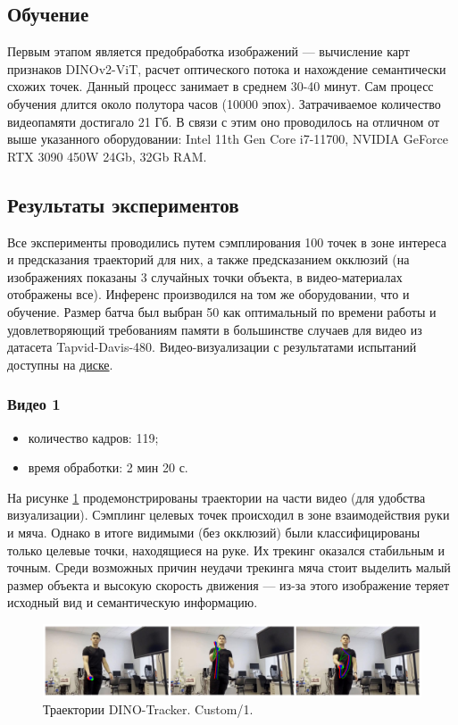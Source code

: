 \documentclass[a4paper, 14pt]{extarticle}
\theoremstyle{definition}
\theoremstyle{plain}
\theoremstyle{remark}
\begin{document}
\subsection{Обучение}

Первым этапом является предобработка изображений --- вычисление карт признаков DINOv2-ViT, расчет оптического потока и нахождение семантически схожих точек. Данный процесс занимает в среднем 30-40 минут. Сам процесс обучения длится около полутора часов (10000 эпох).
Затрачиваемое количество видеопамяти достигало 21 Гб. В связи с этим оно проводилось на отличном от выше указанного оборудовании: Intel 11th Gen Core i7-11700, NVIDIA GeForce RTX 3090 450W 24Gb, 32Gb RAM.

\subsection{Результаты экспериментов}
Все эксперименты проводились путем сэмплирования 100 точек в зоне интереса и предсказания траекторий для них, а также предсказанием окклюзий (на изображениях показаны 3 случайных точки объекта, в видео-материалах отображены все). Инференс производился на том же оборудовании, что и обучение. Размер батча был выбран 50 как оптимальный по времени работы и удовлетворяющий требованиям памяти в большинстве случаев для видео из датасета Tapvid-Davis-480. Видео-визуализации с результатами испытаний доступны на \href{https://drive.google.com/drive/folders/1jyuXTmpgYpkRt16hLX30Lu-oDO__paxN?usp=drive_link}{диске}.

\subsubsection{Видео 1}
\begin{itemize}
	\item количество кадров: 119;
	\item время обработки: 2 мин 20 с.
\end{itemize}

На рисунке \ref{fig:custom-1} продемонстрированы траектории на части видео (для удобства визуализации). Сэмплинг целевых точек происходил в зоне взаимодействия руки и мяча. Однако в итоге видимыми (без окклюзий) были классифицированы только целевые точки, находящиеся на руке. Их трекинг оказался стабильным и точным. Среди возможных причин неудачи трекинга мяча стоит выделить малый размер объекта и высокую скорость движения --- из-за этого изображение теряет исходный вид и семантическую информацию. 
\begin{figure}
    [H]
    \centering
    \includegraphics[width=\textwidth]{figs/custom-1.png}
    \caption{Траектории DINO-Tracker. Custom/1.}
    \label{fig:custom-1}
\end{figure}
\end{document}
